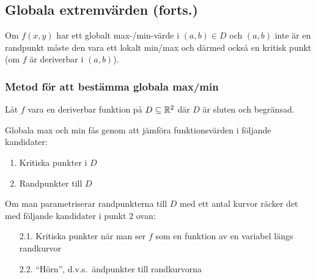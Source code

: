 \documentclass[a4paper]{article}
\begin{document}
\providecommand\fname{}
\renewcommand\fname{19-09-18}

\subsection{Globala extremvärden (forts.)}
Om \(
    f(x,y) 
\) har ett globalt max-/min-värde i \(
    (a,b) \in D
\) och \(
    (a,b)
\) inte är en randpunkt måste den vara ett lokalt min/max och därmed också
en kritisk punkt (om \(
    f
\) är deriverbar i \(
    (a,b)
\)). 

\subsubsection{Metod för att bestämma globala max/min}
Låt \(
    f
\) vara en deriverbar funktion på \(
    D \subseteq \mathbb{R}^2
\) där \(
    D
\) är sluten och begränsad. 

Globala max och min fås genom att jämföra funktionsvärden i följande 
kandidater:
\begin{enumerate}
    \item Kritiska punkter i \(
        D
    \) 
    \item Randpunkter till \(
        D
    \) 
\end{enumerate}

Om man parametriserar randpunkterna till \(
    D
\) med ett antal kurvor räcker det med följande kandidater i punkt \(
    2
\) ovan: 

\begin{enumerate}
    \item[2.1.] Kritiska punkter när man ser \(
        f
    \) som en funktion av en variabel längs randkurvor
    \item[2.2.] \enquote{Hörn}, d.v.s.\ ändpunkter till randkurvorna
\end{enumerate}
\end{document}
